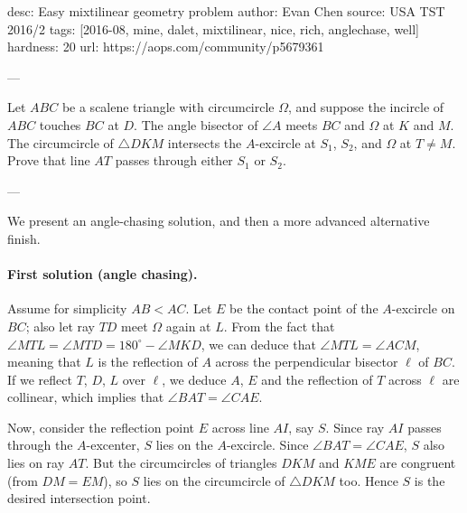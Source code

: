 desc: Easy mixtilinear geometry problem
author: Evan Chen
source: USA TST 2016/2
tags: [2016-08, mine, dalet, mixtilinear, nice, rich, anglechase, well]
hardness: 20
url: https://aops.com/community/p5679361

---

Let $ABC$ be a scalene triangle with circumcircle $\Omega$,
and suppose the incircle of $ABC$ touches $BC$ at $D$.
The angle bisector of $\angle A$ meets $BC$ and $\Omega$ at $K$ and $M$.
The circumcircle of $\triangle DKM$ intersects the $A$-excircle
at $S_1$, $S_2$, and $\Omega$ at $T \neq M$.
Prove that line $AT$ passes through either $S_1$ or $S_2$.

---

We present an angle-chasing solution,
and then a more advanced alternative finish.

\paragraph{First solution (angle chasing).}
Assume for simplicity $AB < AC$.
Let $E$ be the contact point of the $A$-excircle on $BC$;
also let ray $TD$ meet $\Omega$ again at $L$.
From the fact that $\angle MTL = \angle MTD = 180^{\circ} - \angle MKD$,
we can deduce that $\angle MTL = \angle ACM$,
meaning that $L$ is the reflection of $A$ across the
perpendicular bisector $\ell$ of $BC$.
If we reflect $T$, $D$, $L$ over $\ell$, we deduce $A$, $E$ and the reflection of $T$ across
$\ell$ are collinear, which implies that $\angle BAT = \angle CAE$.

Now, consider the reflection point $E$ across line $AI$, say $S$.
Since ray $AI$ passes through the $A$-excenter, $S$ lies on the $A$-excircle.
Since $\angle BAT = \angle CAE$, $S$ also lies on ray $AT$.
But the circumcircles of triangles $DKM$ and $KME$ are congruent (from $DM = EM$),
so $S$ lies on the circumcircle of $\triangle DKM$ too.
Hence $S$ is the desired intersection point.

